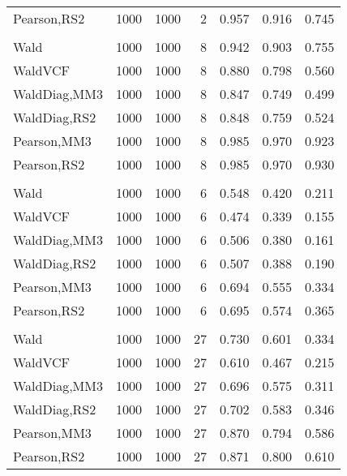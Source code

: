 \documentclass[
]{article}
\begin{document}
\begin{table}[H]
{\begin{tabular}[t]{lrrrrrr}
\hspace{1em}Pearson,RS2 & 1000 & 1000 & 2 & 0.957 & 0.916 & 0.745\\
\addlinespace[0.3em]
\multicolumn{7}{l}{\textbf{1F 15V}}\\
\hspace{1em}Wald & 1000 & 1000 & 8 & 0.942 & 0.903 & 0.755\\
\hspace{1em}WaldVCF & 1000 & 1000 & 8 & 0.880 & 0.798 & 0.560\\
\hspace{1em}WaldDiag,MM3 & 1000 & 1000 & 8 & 0.847 & 0.749 & 0.499\\
\hspace{1em}WaldDiag,RS2 & 1000 & 1000 & 8 & 0.848 & 0.759 & 0.524\\
\hspace{1em}Pearson,MM3 & 1000 & 1000 & 8 & 0.985 & 0.970 & 0.923\\
\hspace{1em}Pearson,RS2 & 1000 & 1000 & 8 & 0.985 & 0.970 & 0.930\\
\addlinespace[0.3em]
\multicolumn{7}{l}{\textbf{2F 10V}}\\
\hspace{1em}Wald & 1000 & 1000 & 6 & 0.548 & 0.420 & 0.211\\
\hspace{1em}WaldVCF & 1000 & 1000 & 6 & 0.474 & 0.339 & 0.155\\
\hspace{1em}WaldDiag,MM3 & 1000 & 1000 & 6 & 0.506 & 0.380 & 0.161\\
\hspace{1em}WaldDiag,RS2 & 1000 & 1000 & 6 & 0.507 & 0.388 & 0.190\\
\hspace{1em}Pearson,MM3 & 1000 & 1000 & 6 & 0.694 & 0.555 & 0.334\\
\hspace{1em}Pearson,RS2 & 1000 & 1000 & 6 & 0.695 & 0.574 & 0.365\\
\addlinespace[0.3em]
\multicolumn{7}{l}{\textbf{3F 15V}}\\
\hspace{1em}Wald & 1000 & 1000 & 27 & 0.730 & 0.601 & 0.334\\
\hspace{1em}WaldVCF & 1000 & 1000 & 27 & 0.610 & 0.467 & 0.215\\
\hspace{1em}WaldDiag,MM3 & 1000 & 1000 & 27 & 0.696 & 0.575 & 0.311\\
\hspace{1em}WaldDiag,RS2 & 1000 & 1000 & 27 & 0.702 & 0.583 & 0.346\\
\hspace{1em}Pearson,MM3 & 1000 & 1000 & 27 & 0.870 & 0.794 & 0.586\\
\hspace{1em}Pearson,RS2 & 1000 & 1000 & 27 & 0.871 & 0.800 & 0.610\\
\bottomrule
\end{tabular}}
\endgroup{}
\end{table}
\end{document}
